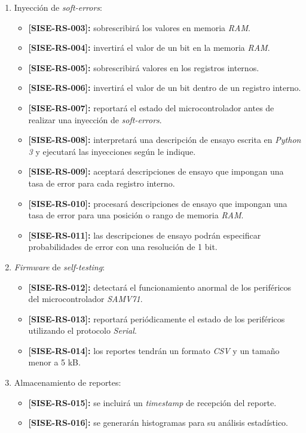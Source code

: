\documentclass[
11pt, %
codirector, %
]{charter}
\def\codigo{SISE-RS}
\newcommand{\req}[1]{\textbf{[\codigo-#1]:}}
\begin{document}
\begin{enumerate}
	\item Inyección de \emph{soft-errors}:
	\begin{itemize}
		\item \req{003} sobrescribirá los valores en memoria \emph{RAM}.
		\item \req{004} invertirá el valor de un bit en la memoria \emph{RAM}.
		\item \req{005} sobrescribirá valores en los registros internos.
		\item \req{006} invertirá el valor de un bit dentro de un registro interno.
		\item \req{007} reportará el estado del microcontrolador antes de realizar una inyección de \emph{soft-errors}.
		\item \req{008} interpretará una descripción de ensayo escrita en \emph{Python 3} y ejecutará las inyecciones según le indique.
		\item \req{009} aceptará descripciones de ensayo que impongan una tasa de error para cada registro interno.
		\item \req{010} procesará descripciones de ensayo que impongan una tasa de error para una posición o rango de memoria \emph{RAM}.
		\item \req{011} las descripciones de ensayo podrán especificar probabilidades de error con una resolución de 1 bit.
	\end{itemize}
	\item \emph{Firmware} de \emph{self-testing}:
	\begin{itemize}
		\item \req{012} detectará el funcionamiento anormal de los periféricos del microcontrolador \emph{SAMV71}.
		\item \req{013} reportará periódicamente el estado de los periféricos utilizando el protocolo \emph{Serial}.
		\item \req{014} los reportes tendrán un formato \emph{CSV} y un tamaño menor a 5 kB.
	\end{itemize}
	\item Almacenamiento de reportes:
	\begin{itemize}
		\item \req{015} se incluirá un \emph{timestamp} de recepción del reporte.
		\item \req{016} se generarán histogramas para su análisis estadístico.
	\end{itemize}
\end{enumerate}
\end{document}
